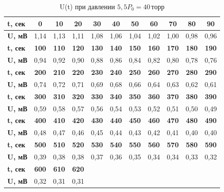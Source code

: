 \documentclass[a4paper, fontsize = 14pt]{article}
\begin{document}
\begin{table}[h]
\centering
\caption{U(t) при давлении $5,5P_0=40 \, торр$}
\begin{tabular}{|l|c|c|c|c|c|c|c|c|c|c|}
\hline
\textbf{t, сек} & \textbf{0}   & \textbf{10}  & \textbf{20}  & \textbf{30}  & \textbf{40}  & \textbf{50}  & \textbf{60}  & \textbf{70}  & \textbf{80}  & \textbf{90}  \\ \hline
\textbf{U, мВ}  & 1,14         & 1,13         & 1,11         & 1,08         & 1,06         & 1,04         & 1,02         & 1,00         & 0,98         & 0,96         \\ \hline
\textbf{t, сек} & \textbf{100} & \textbf{110} & \textbf{120} & \textbf{130} & \textbf{140} & \textbf{150} & \textbf{160} & \textbf{170} & \textbf{180} & \textbf{190} \\ \hline
\textbf{U, мВ}  & 0,94         & 0,92         & 0,90         & 0,88         & 0,86         & 0,84         & 0,82         & 0,80         & 0,78         & 0,76         \\ \hline
\textbf{t, сек} & \textbf{200} & \textbf{210} & \textbf{220} & \textbf{230} & \textbf{240} & \textbf{250} & \textbf{260} & \textbf{270} & \textbf{280} & \textbf{290} \\ \hline
\textbf{U, мВ}  & 0,74         & 0,72         & 0,71         & 0,69         & 0,68         & 0,66         & 0,64         & 0,63         & 0,62         & 0,61         \\ \hline
\textbf{t, сек} & \textbf{300} & \textbf{310} & \textbf{320} & \textbf{330} & \textbf{340} & \textbf{350} & \textbf{360} & \textbf{370} & \textbf{380} & \textbf{390} \\ \hline
\textbf{U, мВ}  & 0,59         & 0,58         & 0,57         & 0,56         & 0,54         & 0,53         & 0,52         & 0,51         & 0,50         & 0,49         \\ \hline
\textbf{t, сек} & \textbf{400} & \textbf{410} & \textbf{420} & \textbf{430} & \textbf{440} & \textbf{450} & \textbf{460} & \textbf{470} & \textbf{480} & \textbf{490} \\ \hline
\textbf{U, мВ}  & 0,48         & 0,47         & 0,46         & 0,45         & 0,44         & 0,43         & 0,42         & 0,41         & 0,40         & 0,40         \\ \hline
\textbf{t, сек} & \textbf{500} & \textbf{510} & \textbf{520} & \textbf{530} & \textbf{540} & \textbf{550} & \textbf{560} & \textbf{570} & \textbf{580} & \textbf{590} \\ \hline
\textbf{U, мВ}  & 0,39         & 0,38         & 0,38         & 0,37         & 0,36         & 0,35         & 0,34         & 0,34         & 0,33         & 0,32         \\ \hline
\textbf{t, сек} & \textbf{600} & \textbf{610} & \textbf{620} &              &              &              &              &              &              &              \\ \hline
\textbf{U, мВ}  & 0,32         & 0,31         & 0,31         &              &              &              &              &              &              &              \\ \hline
\end{tabular}
\end{table}
\end{document}
